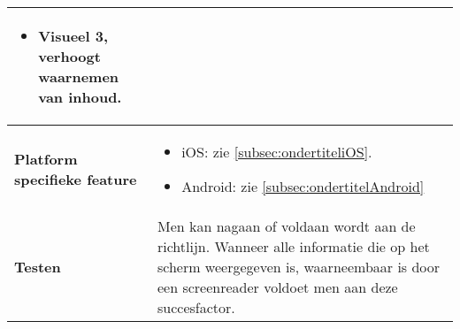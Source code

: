 \begin{table}[H]
\begin{tabular}{|l|p{12cm}|}
\begin{itemize}
            \item Visueel 3, verhoogt waarnemen van inhoud.         
        \end{itemize}                                                                                                                   \\ 
        \hline
        \textbf{Platform specifieke feature} & \begin{itemize}
            \item iOS: zie \ref{subsec:ondertiteliOS}.
            \item Android: zie \ref{subsec:ondertitelAndroid}
        \end{itemize}                                                                                                                                                                       \\ 
        
        \hline
        \textbf{Testen}                      & Men kan nagaan of voldaan wordt aan de richtlijn. Wanneer alle informatie die op het scherm weergegeven is, waarneembaar is door een screenreader voldoet men aan deze succesfactor.                                                                                                                                                        \\
        \hline
    \end{tabular}
\end{table}

